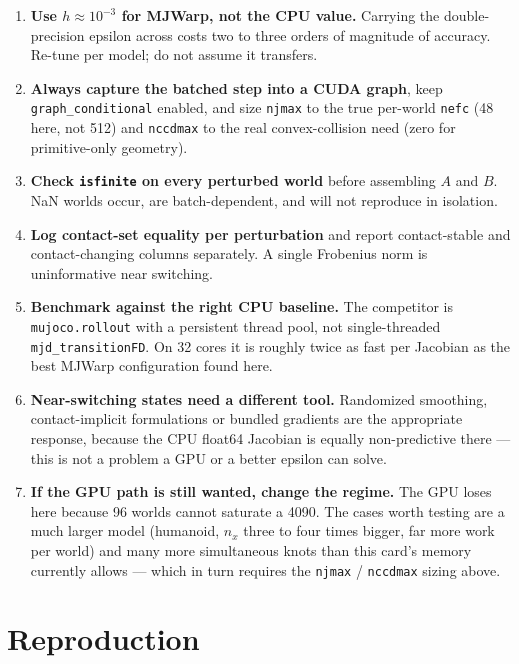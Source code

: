 \documentclass[11pt,a4paper]{article}
\newcommand{\code}[1]{\texttt{\small #1}}
\begin{document}
\begin{enumerate}\itemsep3pt
\item \textbf{Use $h\approx10^{-3}$ for MJWarp, not the CPU value.} Carrying the
double-precision epsilon across costs two to three orders of magnitude of accuracy. Re-tune
per model; do not assume it transfers.
\item \textbf{Always capture the batched step into a CUDA graph}, keep
\code{graph\_conditional} enabled, and size \code{njmax} to the true per-world \code{nefc}
(48 here, not 512) and \code{nccdmax} to the real convex-collision need (zero for
primitive-only geometry).
\item \textbf{Check \code{isfinite} on every perturbed world} before assembling $A$ and $B$.
NaN worlds occur, are batch-dependent, and will not reproduce in isolation.
\item \textbf{Log contact-set equality per perturbation} and report contact-stable and
contact-changing columns separately. A single Frobenius norm is uninformative near switching.
\item \textbf{Benchmark against the right CPU baseline.} The competitor is
\code{mujoco.rollout} with a persistent thread pool, not single-threaded
\code{mjd\_transitionFD}. On 32 cores it is roughly twice as fast per Jacobian as the best
MJWarp configuration found here.
\item \textbf{Near-switching states need a different tool.} Randomized smoothing,
contact-implicit formulations or bundled gradients are the appropriate response, because the
CPU float64 Jacobian is equally non-predictive there --- this is not a problem a GPU or a
better epsilon can solve.
\item \textbf{If the GPU path is still wanted, change the regime.} The GPU loses here because
96 worlds cannot saturate a 4090. The cases worth testing are a much larger model (humanoid,
$n_x$ three to four times bigger, far more work per world) and many more simultaneous knots
than this card's memory currently allows --- which in turn requires the \code{njmax} /
\code{nccdmax} sizing above.
\end{enumerate}

\section{Reproduction}
\end{document}

